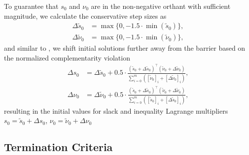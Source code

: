 \documentclass[letterpaper, 10 pt, conference]{ieeeconf}  \IEEEoverridecommandlockouts
\begin{document}
To guarantee that $s_0$ and $\nu_0$ are in the non-negative orthant with sufficient magnitude, we calculate the conservative step sizes as
\begin{equation*}
\begin{aligned}
\Delta \tilde{s}_0 &= \max \{0, -1.5 \cdot \min(\tilde{s}_0)\}, \\
\Delta \tilde{\nu}_0 &= \max \{0, -1.5 \cdot \min(\tilde{\nu}_0)\},
\end{aligned}
\end{equation*}
and similar to \cite{pougkakiotis2021}, we shift initial solutions further away from the barrier based on the normalized complementarity violation
\begin{equation*}
\begin{aligned}
\Delta s_0 &= \Delta \tilde{s}_0 + 0.5 \cdot \frac{(\tilde{s}_0 + \Delta \tilde{s}_0)^\top(\tilde{\nu}_0 + \Delta \tilde{\nu}_0)}{\sum_{i=0}^m ([\tilde{\nu}_0]_i + [\Delta \tilde{\nu}_0]_i)}, \\
\Delta \nu_0 &= \Delta \tilde{\nu}_0 + 0.5 \cdot \frac{(\tilde{s}_0 + \Delta \tilde{s}_0)^\top(\tilde{\nu}_0 + \Delta \tilde{\nu}_0)}{\sum_{i=0}^m ([\tilde{s}_0]_i + [\Delta \tilde{s}_0]_i)},
\end{aligned}
\end{equation*}
resulting in the initial values for slack and inequality Lagrange multipliers 
$s_0 = \tilde{s}_0 + \Delta s_0$, $\nu_0 = \tilde{\nu}_0 + \Delta \nu_0$

\subsection{Termination Criteria}
\end{document}
